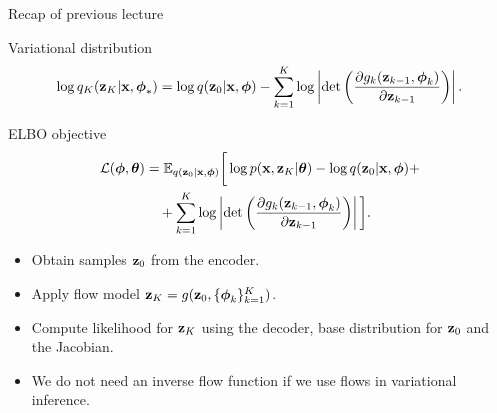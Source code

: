 \begin{frame}{Recap of previous lecture}
	\begin{block}{Variational distribution}
		\vspace{-0.6cm}
		\[
			\log q_K(\mathbf{z}_K | \mathbf{x}, \boldsymbol{\phi}_*) = \log q(\mathbf{z}_0 | \mathbf{x}, \boldsymbol{\phi}) - \sum_{k=1}^K \log \left| \det \left( \frac{\partial g_k(\mathbf{z}_{k - 1}, \boldsymbol{\phi}_k)}{\partial \mathbf{z}_{k-1}} \right) \right|.
		\]
		\vspace{-0.6cm}
	\end{block}
	\begin{block}{ELBO objective}
		\vspace{-0.7cm}
		\begin{align*}
			\mathcal{L} (\boldsymbol{\phi}, \boldsymbol{\theta}) 
			&= \mathbb{E}_{q(\mathbf{z}_0 | \mathbf{x}, \boldsymbol{\phi})} \bigg[\log p(\mathbf{x}, \mathbf{z}_K | \boldsymbol{\theta}) -  \log q(\mathbf{z}_0 | \mathbf{x}, \boldsymbol{\phi} ) + \\ & \quad  + \sum_{k=1}^K \log \left| \det \left( \frac{\partial g_k(\mathbf{z}_{k - 1}, \boldsymbol{\phi}_k)}{\partial \mathbf{z}_{k-1}} \right) \right| \bigg].
		\end{align*}
		\vspace{-0.5cm}
	\end{block}
	\begin{itemize}
		\item Obtain samples $\mathbf{z}_0$ from the encoder.
		\item Apply flow model $\mathbf{z}_K = g(\mathbf{z}_0, \{\boldsymbol{\phi}_k\}_{k = 1}^K)$.
		\item Compute likelihood for $\mathbf{z}_K$ using the decoder, base distribution for $\mathbf{z}_0$ and the Jacobian.
		\item We do not need an inverse flow function if we use flows in variational inference.
	\end{itemize}
\end{frame}

